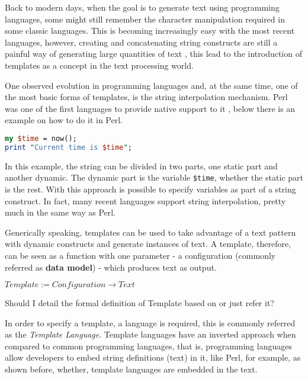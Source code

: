 Back to modern days, when the goal is to generate text using programming languages, some might still remember the character manipulation required in some classic languages. This is becoming increasingly easy with the most recent languages, however, creating and concatenating string constructs are still a painful way of generating large quantities of text \cite{Fowler2003PatternsArchitecture}, this lead to the introduction of templates as a concept in the text processing world.

One observed evolution in programming languages and, at the same time, one of the most basic forms of templates, is the string interpolation mechanism. Perl was one of the first languages to provide native support to it \cite{Wall2000ProgrammingPerl}, below there is an example on how to do it in Perl.

\begin{lstlisting}[language=Perl]
my $time = now();
print "Current time is $time";
\end{lstlisting}

In this example, the string can be divided in two parts, one static part and another dynamic. The dynamic part is the variable \texttt{\$time}, whether the static part is the rest. With this approach is possible to specify variables as part of a string construct. In fact, many recent languages support string interpolation, pretty much in the same way as Perl. 

Generically speaking, templates can be used to take advantage of a text pattern with dynamic constructs and generate instances of text. A template, therefore, can be seen as a function with one parameter - a configuration (commonly referred as \textbf{data model}) - which produces text as output. 

\begin{center}
$Template := Configuration \rightarrow Text$
\end{center}

\begin{orientador}
    Should I detail the formal definition of Template based on \cite{Parr2004EnforcingEngines} or just refer it?
\end{orientador}

In order to specify a template, a language is required, this is commonly referred as the \textit{Template Language}. Template languages have an inverted approach when compared to common programming languages, that is, programming languages allow developers to embed string definitions (text) in it, like Perl, for example, as shown before, whether, template languages are embedded in the text.

